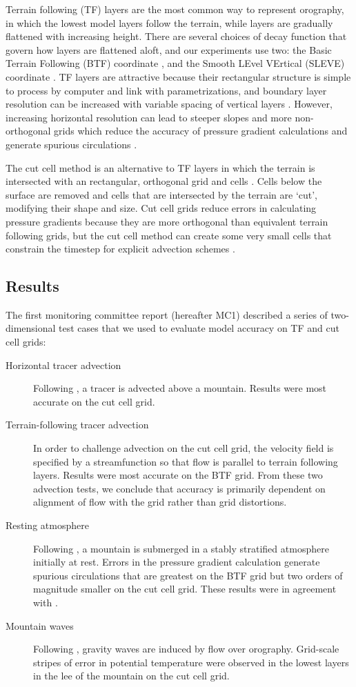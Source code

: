 \documentclass[a4paper]{article}
\begin{document}
Terrain following (TF) layers are the most common way to represent orography, in which the lowest model layers follow the terrain, while layers are gradually flattened with increasing height.  There are several choices of decay function that govern how layers are flattened aloft, and our experiments use two: the Basic Terrain Following (BTF) coordinate \citep{galchen-somerville1975}, and the Smooth LEvel VErtical (SLEVE) coordinate \citep{schaer2002}.  TF layers are attractive because their rectangular structure is simple to process by computer and link with parametrizations, and boundary layer resolution can be increased with variable spacing of vertical layers \citep{schaer2002}.
However, increasing horizontal resolution can lead to steeper slopes and more non-orthogonal grids which reduce the accuracy of pressure gradient calculations and generate spurious circulations \citep{dempsey-davis1998,klemp2011}.

The cut cell method is an alternative to TF layers in which the terrain is intersected with an rectangular, orthogonal grid and cells \citep{adcroft1997}.  Cells below the surface are removed and cells that are intersected by the terrain are `cut', modifying their shape and size.  Cut cell grids reduce errors in calculating pressure gradients because they are more orthogonal than equivalent terrain following grids, but the cut cell method can create some very small cells that constrain the timestep for explicit advection schemes \citep{klein2009}.

\subsection{Results}
The first monitoring committee report (hereafter MC1) described a series of two-dimensional test cases that we used to evaluate model accuracy on TF and cut cell grids:
\begin{description}
	\item[Horizontal tracer advection]{Following \citet{schaer2002}, a tracer is advected above a mountain.  Results were most accurate on the cut cell grid.}
	\item[Terrain-following tracer advection]{In order to challenge advection on the cut cell grid, the velocity field is specified by a streamfunction so that flow is parallel to terrain following layers.  Results were most accurate on the BTF grid.  From these two advection tests, we conclude that accuracy is primarily dependent on alignment of flow with the grid rather than grid distortions.}
	\item[Resting atmosphere]{Following \citet{klemp2011}, a mountain is submerged in a stably stratified atmosphere initially at rest.  Errors in the pressure gradient calculation generate spurious circulations that are greatest on the BTF grid but two orders of magnitude smaller on the cut cell grid.  These results were in agreement with \citet{good2014}.}
	\item[Mountain waves]{Following \citet{schaer2002}, gravity waves are induced by flow over orography.  Grid-scale stripes of error in potential temperature were observed in the lowest layers in the lee of the mountain on the cut cell grid.}
\end{description}
\end{document}
